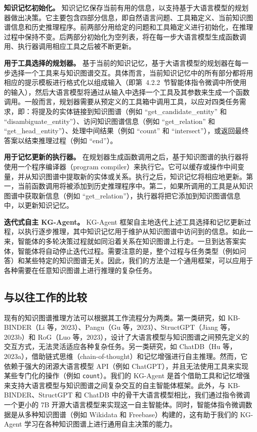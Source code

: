 \documentclass[11pt,UTF8,fontset=fandol]{ctexart}
\begin{document}
\textbf{知识记忆初始化。}
知识记忆保存当前有用的信息，以支持基于大语言模型的规划器做出决策。它主要包含四部分信息，即自然语言问题、工具箱定义、当前知识图谱信息和历史推理程序。前两部分用给定的问题和工具箱定义进行初始化，在推理过程中保持不变。后两部分初始化为空列表，将在每一步大语言模型生成函数调用、执行器调用相应工具之后被不断更新。

\textbf{用于工具选择的规划器。}
基于当前的知识记忆，基于大语言模型的规划器在每一步选择一个工具来与知识图谱交互。具体而言，当前知识记忆中的所有部分都将用相应的提示模板进行格式化以组成输入（即第~4.2.2~节智能体指令微调中所使用的输入），然后大语言模型将通过从输入中选择一个工具及其参数来生成一个函数调用。一般而言，规划器需要从预定义的工具箱中调用工具，以应对四类任务需求，即：将提及的实体链接到知识图谱（例如 ``get\_candidate\_entity'' 和 ``disambiguate\_entity''）、访问知识图谱信息（例如 ``get\_relation'' 和 ``get\_head\_entity''）、处理中间结果（例如 ``count'' 和 ``intersect''），或返回最终答案以结束推理过程（例如 ``end''）。

\textbf{用于记忆更新的执行器。}
在规划器生成函数调用之后，基于知识图谱的执行器将使用一个程序编译器（program compiler）来执行它。它可以缓存或操作中间变量，并从知识图谱中提取新的实体或关系。执行之后，知识记忆将相应地更新。第一，当前函数调用将被添加到历史推理程序中。第二，如果所调用的工具是从知识图谱中获取新信息（例如 ``get\_relation''），执行器将把它添加到知识图谱信息中，以更新知识记忆。

\textbf{迭代式自主 KG-Agent。}
KG-Agent 框架自主地迭代上述工具选择和记忆更新过程，以执行逐步推理，其中知识记忆用于维护从知识图谱中访问到的信息。如此一来，智能体的多轮决策过程就如同沿着关系在知识图谱上行走。一旦到达答案实体，智能体将自动停止迭代过程。需要注意的是，整个过程与任务类型（例如问答）和某些特定的知识图谱无关。因此，我们的方法是一个通用框架，可以应用于各种需要在任意知识图谱上进行推理的复杂任务。

\subsection{与以往工作的比较}

现有的知识图谱推理方法可以根据其工作流程分为两类。第一类研究，如 KB-BINDER（Li 等，2023）、Pangu（Gu 等，2023）、StructGPT（Jiang 等，2023b）和 RoG（Luo 等，2023），设计了大语言模型与知识图谱之间预先定义的交互方式，无法灵活适应各种复杂任务。另一类研究，如 ChatDB（Hu 等，2023a），借助链式思维（chain-of-thought）和记忆增强进行自主推理。然而，它依赖于强大的闭源大语言模型 API（例如 ChatGPT），并且无法使用工具来实现某些专门化的操作（例如 \texttt{count}）。我们的 KG-Agent 是首个借助工具和记忆增强来支持大语言模型与知识图谱之间复杂交互的自主智能体框架。此外，与 KB-BINDER、StructGPT 和 ChatDB 中的骨干大语言模型相比，我们通过指令微调一个更小的 7B 开源大语言模型来实现这一自主智能体。同时，智能体指令微调数据是从多种知识图谱（例如 Wikidata 和 Freebase）构建的，这有助于我们的 KG-Agent 学习在各种知识图谱上进行通用自主决策的能力。
\end{document}
